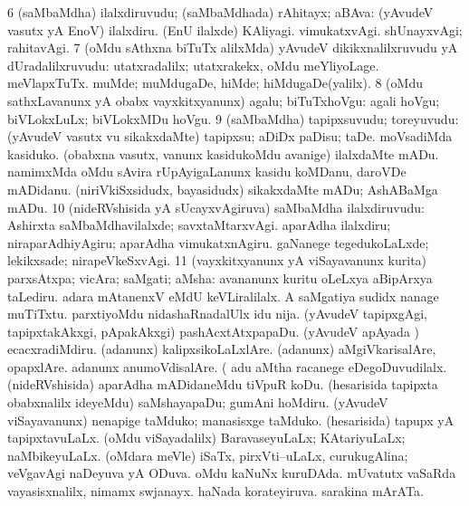 \num{6} (saMbaMdha) ilalxdiruvudu; (saMbaMdhada) rAhitayx; aBAva:  (yAvudeV vasutx yA EnoV) ilalxdiru.  (EnU ilalxde) KAliyagi.  vimukatxvAgi.  shUnayxvAgi; rahitavAgi. 
\num{7} (oMdu sAthxna biTuTx alilxMda) yAvudeV dikikxnalilxruvudu yA dUradalilxruvudu:  utatxradalilx; utatxrakekx,  oMdu meYliyoLage.  meVlapxTuTx.  muMde; muMdugaDe,  hiMde; hiMdugaDe(yalilx). 
\num{8} (oMdu sathxLavanunx yA obabx vayxkitxyanunx) agalu; biTuTxhoVgu:  agali hoVgu; biVLokxLuLx; biVLokxMDu hoVgu. 
\num{9} (saMbaMdha) tapipxsuvudu; toreyuvudu:  (yAvudeV vasutx \mo vu sikakxdaMte) tapipxsu; aDiDx paDisu; taDe.  moVsadiMda kasiduko.  (obabxna vasutx, \mo vanunx kasidukoMdu avanige) ilalxdaMte mADu.  namimxMda oMdu sAvira rUpAyigaLanunx kasidu koMDanu, daroVDe mADidanu.  (niriVkiSxsidudx, bayasidudx) sikakxdaMte mADu; AshABaMga mADu. 
\num{10} (nideRVshisida yA sUcayxvAgiruva) saMbaMdha ilalxdiruvudu:  Ashirxta saMbaMdhavilalxde; savxtaMtarxvAgi.  aparAdha ilalxdiru; niraparAdhiyAgiru; aparAdha vimukatxnAgiru.  gaNanege tegedukoLaLxde; lekikxsade; nirapeVkeSxvAgi. 
\num{11} (vayxkitxyanunx yA viSayavanunx kurita) parxsAtxpa; vicAra; saMgati; aMsha:  avananunx kuritu oLeLxya aBipArxya taLediru.  adara mAtanenxV eMdU keVLiralilalx.  A saMgatiya sudidx nanage muTiTxtu.  parxtiyoMdu nidashaRnadalUlx idu nija.  (yAvudeV tapipxgAgi, tapipxtakAkxgi, pApakAkxgi) pashAcxtAtxpapaDu.  (yAvudeV apAyada \vi) ecacxradiMdiru.  (adanunx) kalipxsikoLaLxlAre.  (adanunx) aMgiVkarisalAre, opapxlAre.  adanunx anumoVdisalAre.  (  adu aMtha racanege eDegoDuvudilalx.  (nideRVshisida) aparAdha mADidaneMdu tiVpuR koDu.  (hesarisida tapipxta obabxnalilx ideyeMdu) saMshayapaDu; gumAni hoMdiru.  (yAvudeV viSayavanunx) nenapige taMduko; manasisxge taMduko.  (hesarisida) tapupx yA tapipxtavuLaLx.  (oMdu viSayadalilx) BaravaseyuLaLx; KAtariyuLaLx; naMbikeyuLaLx.  (oMdara meVle) iSaTx, pirxVti--uLaLx,  curukugAlina; veVgavAgi naDeyuva yA ODuva.  oMdu kaNuNx kuruDAda.  mUvatutx vaSaRda vayasisxnalilx,  nimamx swjanayx.  haNada korateyiruva.  sarakina mArATa. 
